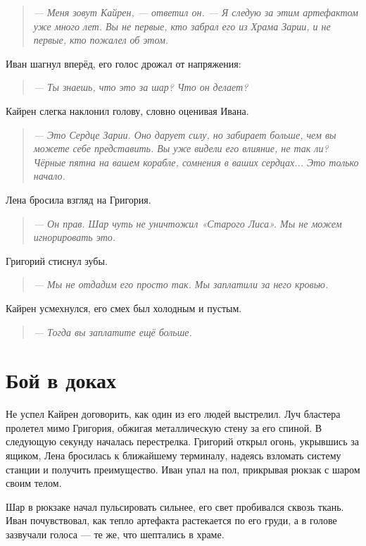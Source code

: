 \documentclass[12pt,a4paper]{book}
\newenvironment{dialogue}{\begin{quote}\itshape}{\end{quote}} %
\begin{document}
\begin{dialogue}
--- Меня зовут Кайрен, --- ответил он. --- Я следую за этим артефактом уже много лет. Вы не первые, кто забрал его из Храма Зарии, и не первые, кто пожалел об этом.
\end{dialogue}

Иван шагнул вперёд, его голос дрожал от напряжения:

\begin{dialogue}
--- Ты знаешь, что это за шар? Что он делает?
\end{dialogue}

Кайрен слегка наклонил голову, словно оценивая Ивана.

\begin{dialogue}
--- Это Сердце Зарии. Оно дарует силу, но забирает больше, чем вы можете себе представить. Вы уже видели его влияние, не так ли? Чёрные пятна на вашем корабле, сомнения в ваших сердцах... Это только начало.
\end{dialogue}

Лена бросила взгляд на Григория.

\begin{dialogue}
--- Он прав. Шар чуть не уничтожил «Старого Лиса». Мы не можем игнорировать это.
\end{dialogue}

Григорий стиснул зубы.

\begin{dialogue}
--- Мы не отдадим его просто так. Мы заплатили за него кровью.
\end{dialogue}

Кайрен усмехнулся, его смех был холодным и пустым.

\begin{dialogue}
--- Тогда вы заплатите ещё больше.
\end{dialogue}

\section*{Бой в доках}

Не успел Кайрен договорить, как один из его людей выстрелил. Луч бластера пролетел мимо Григория, обжигая металлическую стену за его спиной. В следующую секунду началась перестрелка. Григорий открыл огонь, укрывшись за ящиком, Лена бросилась к ближайшему терминалу, надеясь взломать систему станции и получить преимущество. Иван упал на пол, прикрывая рюкзак с шаром своим телом.

Шар в рюкзаке начал пульсировать сильнее, его свет пробивался сквозь ткань. Иван почувствовал, как тепло артефакта растекается по его груди, а в голове зазвучали голоса --- те же, что шептались в храме.
\end{document}
